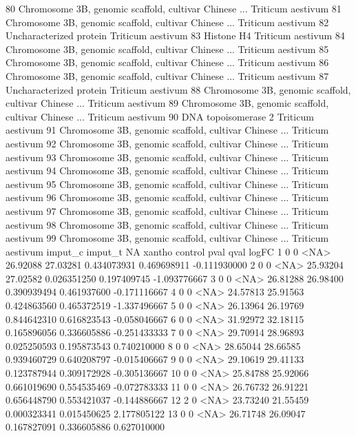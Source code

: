 \documentclass{beamer}
\begin{document}
\begin{frame}[fragile]
\begin{itemize}
\begin{Schunk}
\begin{Soutput}
80 Chromosome 3B, genomic scaffold, cultivar Chinese ... Triticum aestivum
81 Chromosome 3B, genomic scaffold, cultivar Chinese ... Triticum aestivum
82                               Uncharacterized protein Triticum aestivum
83                                            Histone H4 Triticum aestivum
84 Chromosome 3B, genomic scaffold, cultivar Chinese ... Triticum aestivum
85 Chromosome 3B, genomic scaffold, cultivar Chinese ... Triticum aestivum
86 Chromosome 3B, genomic scaffold, cultivar Chinese ... Triticum aestivum
87                               Uncharacterized protein Triticum aestivum
88 Chromosome 3B, genomic scaffold, cultivar Chinese ... Triticum aestivum
89 Chromosome 3B, genomic scaffold, cultivar Chinese ... Triticum aestivum
90                                   DNA topoisomerase 2 Triticum aestivum
91 Chromosome 3B, genomic scaffold, cultivar Chinese ... Triticum aestivum
92 Chromosome 3B, genomic scaffold, cultivar Chinese ... Triticum aestivum
93 Chromosome 3B, genomic scaffold, cultivar Chinese ... Triticum aestivum
94 Chromosome 3B, genomic scaffold, cultivar Chinese ... Triticum aestivum
95 Chromosome 3B, genomic scaffold, cultivar Chinese ... Triticum aestivum
96 Chromosome 3B, genomic scaffold, cultivar Chinese ... Triticum aestivum
97 Chromosome 3B, genomic scaffold, cultivar Chinese ... Triticum aestivum
98 Chromosome 3B, genomic scaffold, cultivar Chinese ... Triticum aestivum
99 Chromosome 3B, genomic scaffold, cultivar Chinese ... Triticum aestivum
   imput_c imput_t   NA   xantho  control        pval        qval        logFC
1        0       0 <NA> 26.92088 27.03281 0.434073931 0.469698911 -0.111930000
2        0       0 <NA> 25.93204 27.02582 0.026351250 0.197409745 -1.093776667
3        0       0 <NA> 26.81288 26.98400 0.390939494 0.461937600 -0.171116667
4        0       0 <NA> 24.57813 25.91563 0.424863560 0.465372519 -1.337496667
5        0       0 <NA> 26.13964 26.19769 0.844642310 0.616823543 -0.058046667
6        0       0 <NA> 31.92972 32.18115 0.165896056 0.336605886 -0.251433333
7        0       0 <NA> 29.70914 28.96893 0.025250593 0.195873543  0.740210000
8        0       0 <NA> 28.65044 28.66585 0.939460729 0.640208797 -0.015406667
9        0       0 <NA> 29.10619 29.41133 0.123787944 0.309172928 -0.305136667
10       0       0 <NA> 25.84788 25.92066 0.661019690 0.554535469 -0.072783333
11       0       0 <NA> 26.76732 26.91221 0.656448790 0.553421037 -0.144886667
12       2       0 <NA> 23.73240 21.55459 0.000323341 0.015450625  2.177805122
13       0       0 <NA> 26.71748 26.09047 0.167827091 0.336605886  0.627010000

\end{Soutput}
\end{Schunk}
\end{itemize}
\end{frame}
\end{document}
